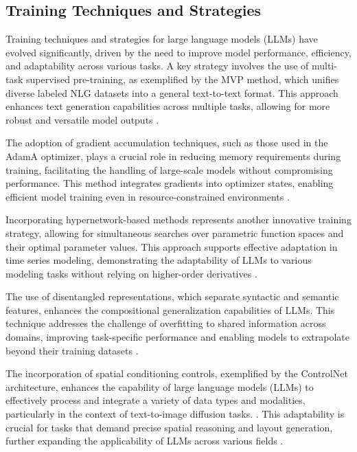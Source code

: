 \subsection{Training Techniques and Strategies} \label{subsec:Training Techniques and Strategies}



Training techniques and strategies for large language models (LLMs) have evolved significantly, driven by the need to improve model performance, efficiency, and adaptability across various tasks. A key strategy involves the use of multi-task supervised pre-training, as exemplified by the MVP method, which unifies diverse labeled NLG datasets into a general text-to-text format. This approach enhances text generation capabilities across multiple tasks, allowing for more robust and versatile model outputs \cite{tang2023mvpmultitasksupervisedpretraining}.



The adoption of gradient accumulation techniques, such as those used in the AdamA optimizer, plays a crucial role in reducing memory requirements during training, facilitating the handling of large-scale models without compromising performance. This method integrates gradients into optimizer states, enabling efficient model training even in resource-constrained environments \cite{zhang2023adamaccumulationreducememory}.



Incorporating hypernetwork-based methods represents another innovative training strategy, allowing for simultaneous searches over parametric function spaces and their optimal parameter values. This approach supports effective adaptation in time series modeling, demonstrating the adaptability of LLMs to various modeling tasks without relying on higher-order derivatives \cite{stank2024designingtimeseriesmodelshypernetworks}.



The use of disentangled representations, which separate syntactic and semantic features, enhances the compositional generalization capabilities of LLMs. This technique addresses the challenge of overfitting to shared information across domains, improving task-specific performance and enabling models to extrapolate beyond their training datasets \cite{zheng2023layerwiserepresentationfusioncompositional}.



The incorporation of spatial conditioning controls, exemplified by the ControlNet architecture, enhances the capability of large language models (LLMs) to effectively process and integrate a variety of data types and modalities, particularly in the context of text-to-image diffusion tasks. \cite{zhang2023adding}. This adaptability is crucial for tasks that demand precise spatial reasoning and layout generation, further expanding the applicability of LLMs across various fields .



